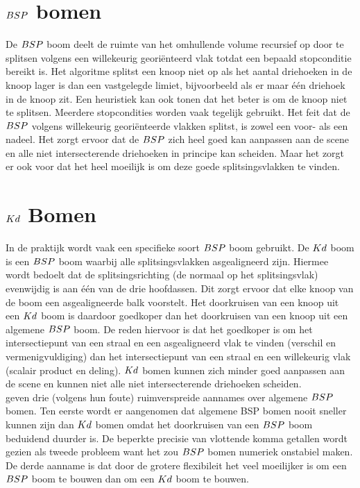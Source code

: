 \section{$BSP$ bomen}
    De $BSP$ boom deelt de ruimte van het omhullende volume recursief op door te splitsen volgens een willekeurig georiënteerd vlak totdat een bepaald stopconditie bereikt is.
    Het algoritme splitst een knoop niet op als het aantal driehoeken in de knoop lager is dan een vastgelegde limiet, bijvoorbeeld als er maar één driehoek in de knoop zit.
    Een heuristiek kan ook tonen dat het beter is om de knoop niet te splitsen.    
    Meerdere stopcondities worden vaak tegelijk gebruikt.
    Het feit dat de $BSP$ volgens willekeurig georiënteerde vlakken splitst, is zowel een voor- als een nadeel.
    Het zorgt ervoor dat de $BSP$ zich heel goed kan aanpassen aan de scene en alle niet intersecterende driehoeken in principe kan scheiden.
    Maar het zorgt er ook voor dat het heel moeilijk is om deze goede splitsingsvlakken te vinden.
    \\



   
\section{$Kd$ Bomen}   
    In de praktijk wordt vaak een specifieke soort $BSP$ boom gebruikt.
    De $Kd$ boom is een $BSP$ boom waarbij alle splitsingsvlakken asgealigneerd zijn.
    Hiermee wordt bedoelt dat de splitsingsrichting (de normaal op het splitsingsvlak) evenwijdig is aan één van de drie hoofdassen.
    Dit zorgt ervoor dat elke knoop van de boom een asgealigneerde balk voorstelt.
    Het doorkruisen van een knoop uit een $Kd$ boom is daardoor goedkoper dan het doorkruisen van een knoop uit een algemene $BSP$ boom.
    De reden hiervoor is dat het goedkoper is om het intersectiepunt van een straal en een asgealigneerd vlak te vinden (verschil en vermenigvuldiging) dan het intersectiepunt van een straal en een willekeurig vlak (scalair product en deling).
    $Kd$ bomen kunnen zich minder goed aanpassen aan de scene en kunnen niet alle niet intersecterende driehoeken scheiden. 
    \\

    \authorIze{} \cite{ize} geven drie (volgens hun foute) ruimverspreide aannames over algemene $BSP$ bomen.
    Ten eerste wordt er aangenomen dat algemene BSP bomen nooit sneller kunnen zijn dan $Kd$ bomen omdat het doorkruisen van een $BSP$ boom beduidend duurder is.
    De beperkte precisie van vlottende komma getallen wordt gezien als tweede probleem want het zou $BSP$ bomen numeriek onstabiel maken.
    De derde aanname is dat door de grotere flexibileit het veel moeilijker is om een $BSP$ boom te bouwen dan om een $Kd$ boom te bouwen.
    

